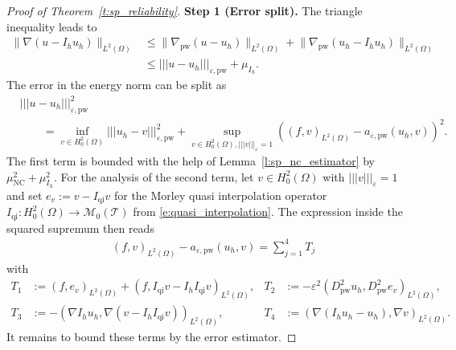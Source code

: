 \documentclass[a4paper]{amsart}
\theoremstyle{definition}
\numberwithin{equation}{section}
\numberwithin{theorem}{section}
\newcommand{\pw}{\mathrm{pw}}
\newcommand{\nc}{\mathrm{NC}}
\newcommand{\tri}{\mathcal{T}}
\newcommand{\ennorm}[1]{\lvert\!\lvert\!\lvert #1 \rvert\!\rvert\!\rvert}
\begin{document}
\begin{proof}[Proof of Theorem~\ref{t:sp_reliability}]
    \textbf{Step 1 (Error split).}
    The triangle inequality leads to
    \begin{align*}
        \lVert \nabla(u-I_h u_h)\rVert_{L^2(\Omega)}
        &\leq \lVert \nabla_\pw(u- u_h)\rVert_{L^2(\Omega)}
           + \lVert \nabla_\pw(u_h-I_h u_h)\rVert_{L^2(\Omega)}\\
        &\leq \ennorm{u-u_h}_{\varepsilon,\pw} + \mu_{I_h}.
    \end{align*}
    The error in the energy norm can be split as 
    \begin{align*}
        &\ennorm{u-u_h}_{\varepsilon,\pw}^2\\
        &\qquad
        =\inf_{v\in H^2_0(\Omega)} \ennorm{u_h-v}_{\varepsilon,\pw}^2
           + \sup_{v\in H^2_0(\Omega),\ennorm{v}_\varepsilon=1}
            \left( 
             (f,v)_{L^2(\Omega)} - a_{\varepsilon,\pw}(u_h,v) \right)^2.
    \end{align*}
    The first term is bounded with the help of 
    Lemma~\ref{l:sp_nc_estimator} by $\mu_\nc^2+\mu_{I_h}^2$.
    For the analysis of the second term,
    let $v\in H^2_0(\Omega)$ with $\ennorm{v}_\varepsilon=1$ and 
    set $e_v:=v-I_\mathrm{qi}v$ for the Morley quasi interpolation operator
    $I_\mathrm{qi}:H^2_0(\Omega)\to\mathcal{M}_0(\tri)$
    from \eqref{e:quasi_interpolation}.
    The expression inside the squared supremum then reads
    \begin{equation*}
    \begin{aligned}
        &(f,v)_{L^2(\Omega)} - a_{\varepsilon,\pw}(u_h,v)
        = \sum_{j=1}^4 T_j
    \end{aligned}
    \end{equation*}
    with 
    \begin{align*}
        T_1&:=(f,e_v)_{L^2(\Omega)} + (f, I_\mathrm{qi}v-I_hI_\mathrm{qi}v)_{L^2(\Omega)},
        &
        T_2&:=-\varepsilon^2 (D^2_\pw u_h,D^2_\pw e_v)_{L^2(\Omega)},\\
        T_3&:=- (\nabla I_h u_h,\nabla (v-I_h I_\mathrm{qi}v))_{L^2(\Omega)},
        &
        T_4&:= (\nabla (I_h u_h-u_h),\nabla v)_{L^2(\Omega)}.
    \end{align*}
    It remains to bound these terms by the error estimator.


\end{proof}
\end{document}
